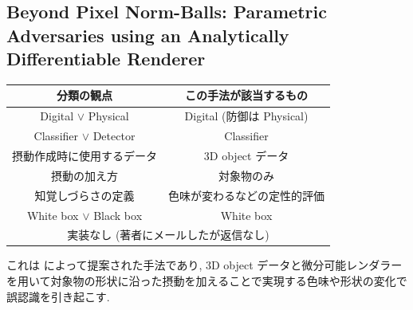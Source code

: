 \subsection{Beyond Pixel Norm-Balls: Parametric Adversaries using an Analytically Differentiable Renderer}
\label{subsec:beyond-pixel}
%
\begin{table}[htbp]
\begin{center}
\begin{tabular}{|c|c|}
\hline
分類の観点 & この手法が該当するもの \\
\hline
Digital $\lor$ Physical & Digital (防御は Physical) \\
Classifier $\lor$ Detector & Classifier \\
摂動作成時に使用するデータ & 3D object データ \\
摂動の加え方 & 対象物のみ \\
知覚しづらさの定義 & 色味が変わるなどの定性的評価 \\
White box $\lor$ Black box & White box \\
\hline
\multicolumn{2}{|c|}{実装なし (著者にメールしたが返信なし)} \\
\hline
\end{tabular}
\label{tb:beyond-pixel-summary}
\end{center}
\end{table}
%

これは \cite{liu2018beyond} によって提案された手法であり, 3D object データと微分可能レンダラーを用いて対象物の形状に沿った摂動を加えることで実現する色味や形状の変化で誤認識を引き起こす.


